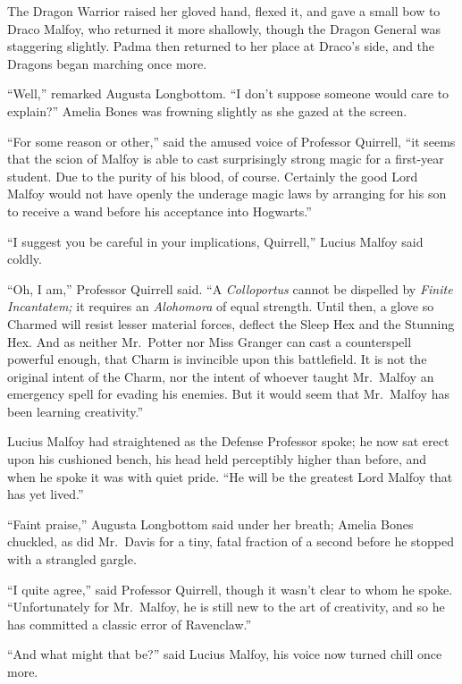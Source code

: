 The Dragon Warrior raised her gloved hand, flexed it, and gave a
small bow to Draco Malfoy, who returned it more shallowly, though
the Dragon General was staggering slightly. Padma then returned to
her place at Draco’s side, and the Dragons began marching once
more.

“Well,” remarked Augusta Longbottom. “I don’t suppose someone
would care to explain?” Amelia Bones was frowning slightly as she
gazed at the screen.

“For some reason or other,” said the amused voice of Professor
Quirrell, “it seems that the scion of Malfoy is able to cast
surprisingly strong magic for a first-year student. Due to the
purity of his blood, of course. Certainly the good Lord Malfoy
would not have openly  the underage magic laws by arranging
for his son to receive a wand before his acceptance into
Hogwarts.”

“I suggest you be careful in your implications, Quirrell,”
Lucius Malfoy said coldly.

“Oh, I am,” Professor Quirrell said. “A \emph{Colloportus}
cannot be dispelled by \emph{Finite Incantatem;} it requires an
\emph{Alohomora} of equal strength. Until then, a glove so Charmed
will resist lesser material forces, deflect the Sleep Hex and the
Stunning Hex. And as neither Mr.~Potter nor Miss Granger can cast a
counterspell powerful enough, that Charm is invincible upon this
battlefield. It is not the original intent of the Charm, nor the
intent of whoever taught Mr.~Malfoy an emergency spell for evading
his enemies. But it would seem that Mr.~Malfoy has been learning
creativity.”

Lucius Malfoy had straightened as the Defense Professor spoke;
he now sat erect upon his cushioned bench, his head held
perceptibly higher than before, and when he spoke it was with quiet
pride. “He will be the greatest Lord Malfoy that has yet
lived.”

“Faint praise,” Augusta Longbottom said under her breath; Amelia
Bones chuckled, as did Mr.~Davis for a tiny, fatal fraction of a
second before he stopped with a strangled gargle.

“I quite agree,” said Professor Quirrell, though it wasn’t clear
to whom he spoke. “Unfortunately for Mr.~Malfoy, he is still new to
the art of creativity, and so he has committed a classic error of
Ravenclaw.”

“And what might that be?” said Lucius Malfoy, his voice now
turned chill once more.

